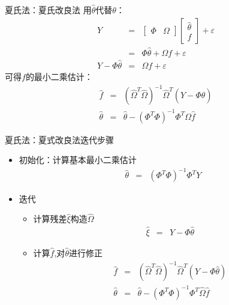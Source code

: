 \begin{frame}{夏氏法：夏氏改良法}
用$\hat\theta$代替$\theta$：
\begin{eqnarray*}
Y &=& \begin{bmatrix} \Phi & \Omega \end{bmatrix} \begin{bmatrix}\hat\theta \\ f \end{bmatrix} + \varepsilon \\
&=& \Phi \hat\theta+ \Omega  f  + \varepsilon \\
Y- \Phi \hat\theta &=& \Omega f  + \varepsilon 
\end{eqnarray*}
可得$f $的最小二乘估计：
\begin{eqnarray*}
\hat f &=& (\hat\Omega^T \hat\Omega)^{-1}\hat\Omega^T(Y- \Phi \hat\theta) \\
\hat\theta &=& \hat\theta-(\Phi^T\Phi)^{-1} \Phi^T \Omega \hat f
\end{eqnarray*}
\end{frame}

\begin{frame}{夏氏法：夏式改良法迭代步骤}
\begin{itemize}
\item 初始化：计算基本最小二乘估计
\begin{eqnarray*}
\hat\theta &=& (\Phi^T\Phi)^{-1} \Phi^T Y
\end{eqnarray*}
\item 迭代
\begin{itemize}
\item 计算残差$\hat\xi$构造$\hat\Omega$
\begin{eqnarray*}
\hat\xi &=& Y- \Phi\hat\theta
\end{eqnarray*}
\item 计算$\hat f$,对$\hat\theta$进行修正
\begin{eqnarray*}
\hat f &=& (\hat\Omega^T \hat\Omega)^{-1}\hat\Omega^T(Y- \Phi \hat\theta) \\
\hat\theta &=& \hat\theta-(\Phi^T\Phi)^{-1} \Phi^T \hat\Omega \hat f
\end{eqnarray*}
\end{itemize}
\end{itemize}
\end{frame}

